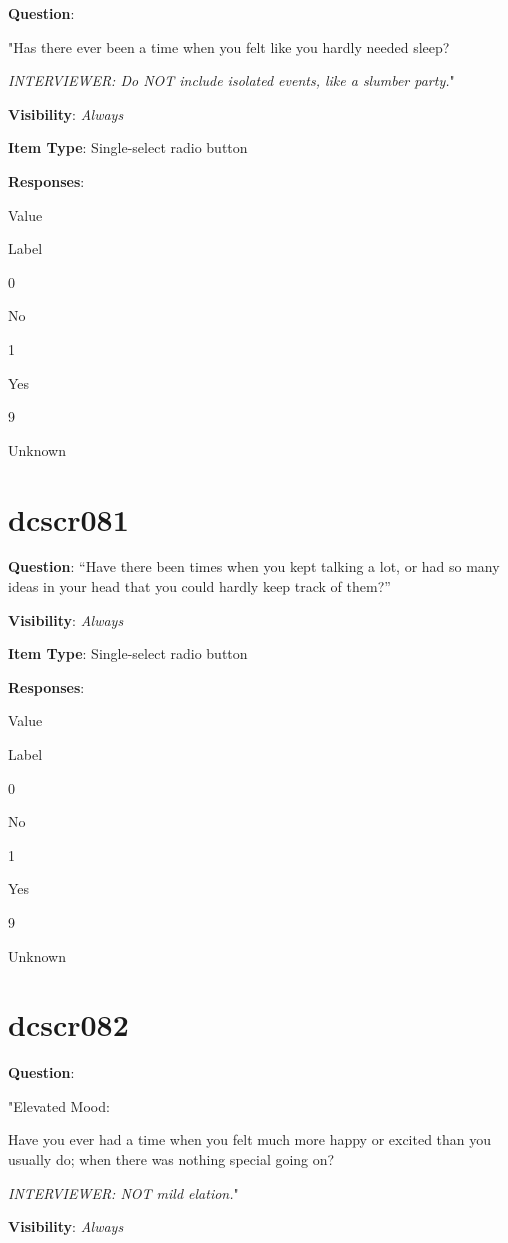 \documentclass[]{book}
\begin{document}
\textbf{Question}:

"Has there ever been a time when you felt like you hardly needed sleep?

\emph{INTERVIEWER: Do NOT include isolated events, like a slumber party.}"

\textbf{Visibility}: \emph{Always}

\textbf{Item Type}: Single-select radio button

\textbf{Responses}:

Value

Label

0

No

1

Yes

9

Unknown

\hypertarget{dcscr081}{%
\section{dcscr081}\label{dcscr081}}

\textbf{Question}: ``Have there been times when you kept talking a lot, or had so many ideas in your head that you could hardly keep track of them?''

\textbf{Visibility}: \emph{Always}

\textbf{Item Type}: Single-select radio button

\textbf{Responses}:

Value

Label

0

No

1

Yes

9

Unknown

\hypertarget{dcscr082}{%
\section{dcscr082}\label{dcscr082}}

\textbf{Question}:

"Elevated Mood:

Have you ever had a time when you felt much more happy or excited than you usually do; when there was nothing special going on?

\emph{INTERVIEWER: NOT mild elation.}"

\textbf{Visibility}: \emph{Always}
\end{document}

